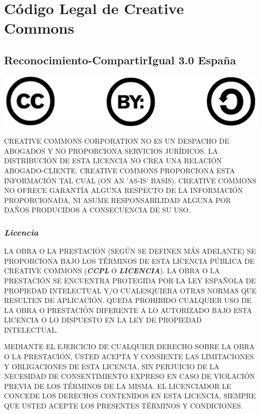 \section*{Código Legal de Creative Commons}
      
        \subsection*{Reconocimiento-CompartirIgual 3.0 España}
      	\begin{center}
		\includegraphics{imagenes/cc-by-sa.png}
	\end{center}

         CREATIVE COMMONS CORPORATION NO ES UN DESPACHO DE ABOGADOS Y NO PROPORCIONA SERVICIOS JURÍDICOS. LA DISTRIBUCIÓN DE ESTA LICENCIA NO CREA UNA RELACIÓN ABOGADO-CLIENTE. CREATIVE COMMONS PROPORCIONA ESTA INFORMACIÓN TAL CUAL (ON AN 'AS-IS' BASIS). CREATIVE COMMONS NO OFRECE GARANTÍA ALGUNA RESPECTO DE LA INFORMACIÓN PROPORCIONADA, NI ASUME RESPONSABILIDAD ALGUNA POR DAÑOS PRODUCIDOS A CONSECUENCIA DE SU USO.

        \subsubsection*{\emph{Licencia}}

        \par LA OBRA O LA PRESTACIÓN (SEGÚN SE DEFINEN MÁS ADELANTE) SE PROPORCIONA BAJO LOS TÉRMINOS DE ESTA LICENCIA PÚBLICA DE CREATIVE COMMONS (\textbf{\emph{CCPL}} O \textbf{\emph{LICENCIA}}). LA OBRA O LA PRESTACIÓN  SE ENCUENTRA PROTEGIDA POR LA LEY ESPAÑOLA DE PROPIEDAD INTELECTUAL Y/O CUALESQUIERA OTRAS NORMAS QUE RESULTEN DE APLICACIÓN. QUEDA PROHIBIDO CUALQUIER USO DE LA OBRA O PRESTACIÓN DIFERENTE A LO AUTORIZADO BAJO ESTA LICENCIA O LO DISPUESTO EN LA LEY DE PROPIEDAD INTELECTUAL.\\

        \par MEDIANTE EL EJERCICIO DE CUALQUIER DERECHO SOBRE LA OBRA O LA PRESTACIÓN, USTED ACEPTA Y CONSIENTE LAS LIMITACIONES Y OBLIGACIONES DE ESTA LICENCIA, SIN PERJUICIO DE LA NECESIDAD DE CONSENTIMIENTO EXPRESO EN CASO DE VIOLACIÓN PREVIA DE LOS TÉRMINOS DE LA MISMA. EL LICENCIADOR LE CONCEDE LOS DERECHOS CONTENIDOS EN ESTA LICENCIA, SIEMPRE QUE USTED ACEPTE LOS PRESENTES TÉRMINOS Y CONDICIONES. \\

